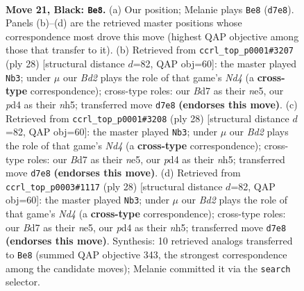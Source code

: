 \documentclass[11pt]{article}
\begin{document}
\clearpage

\begin{figure}[p]\centering
\begin{subfigure}{0.46\textwidth}\centering
\resizebox{\linewidth}{!}{%
\newchessgame
\chessboard[
  setfen={2kr1bn1/pp1b2r1/4p1p1/nP1pP1Pp/P2P1P2/4KN2/8/RNB2B1R b - - 2 21},
  showmover=false,
  pgfstyle=straightmove, color=movearrow, markmove={d7-e8}
]}
\caption{}
\end{subfigure}\hfill
\begin{subfigure}{0.46\textwidth}\centering
\resizebox{\linewidth}{!}{%
\newchessgame
\chessboard[
  setfen={r3k2r/1b1p1ppp/p3p3/1p2n1Pn/3NP3/P1P1BP2/2P4P/2KR1B1R w kq - 1 15},
  showmover=false,
  pgfstyle=straightmove, color=movearrow, markmove={d4-b3}
]}
\caption{}
\end{subfigure}
\\[4pt]
\begin{subfigure}{0.46\textwidth}\centering
\resizebox{\linewidth}{!}{%
\newchessgame
\chessboard[
  setfen={r3k2r/1b1p1ppp/p3p3/1p2n1Pn/3NP3/P1P1BP2/2P4P/2KR1B1R w kq - 1 15},
  showmover=false,
  pgfstyle=straightmove, color=movearrow, markmove={d4-b3}
]}
\caption{}
\end{subfigure}\hfill
\begin{subfigure}{0.46\textwidth}\centering
\resizebox{\linewidth}{!}{%
\newchessgame
\chessboard[
  setfen={r3k2r/1b1p1ppp/p3p3/1p2n1Pn/3NP3/P1P1BP2/2P4P/2KR1B1R w kq - 1 15},
  showmover=false,
  pgfstyle=straightmove, color=movearrow, markmove={d4-b3}
]}
\caption{}
\end{subfigure}
\caption{\textbf{Move 21, Black: \texttt{Be8}.} (a) Our position; Melanie plays \texttt{Be8} (\texttt{d7e8}). Panels (b)--(d) are the retrieved master positions whose correspondence most drove this move (highest QAP objective among those that transfer to it). (b) Retrieved from \texttt{ccrl\_top\_p0001\#3207} (ply 28) [structural distance $d$=82, QAP obj=60]: the master played \texttt{Nb3}; under $\mu$ our \emph{Bd2} plays the role of that game's \emph{Nd4} (a \textbf{cross-type} correspondence); cross-type roles: our \emph{B}d7 as their \emph{n}e5, our \emph{p}d4 as their \emph{n}h5; transferred move \texttt{d7e8} \textbf{(endorses this move)}. (c) Retrieved from \texttt{ccrl\_top\_p0001\#3208} (ply 28) [structural distance $d$=82, QAP obj=60]: the master played \texttt{Nb3}; under $\mu$ our \emph{Bd2} plays the role of that game's \emph{Nd4} (a \textbf{cross-type} correspondence); cross-type roles: our \emph{B}d7 as their \emph{n}e5, our \emph{p}d4 as their \emph{n}h5; transferred move \texttt{d7e8} \textbf{(endorses this move)}. (d) Retrieved from \texttt{ccrl\_top\_p0003\#1117} (ply 28) [structural distance $d$=82, QAP obj=60]: the master played \texttt{Nb3}; under $\mu$ our \emph{Bd2} plays the role of that game's \emph{Nd4} (a \textbf{cross-type} correspondence); cross-type roles: our \emph{B}d7 as their \emph{n}e5, our \emph{p}d4 as their \emph{n}h5; transferred move \texttt{d7e8} \textbf{(endorses this move)}. Synthesis: 10 retrieved analogs transferred to \texttt{Be8} (summed QAP objective 343, the strongest correspondence among the candidate moves); Melanie committed it via the \texttt{search} selector.}
\label{fig:thought-m41}
\end{figure}
\end{document}
